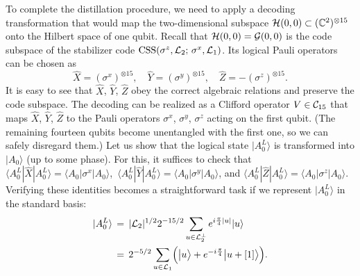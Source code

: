 \documentclass[pra,twocolumn,showpacs]{revtex4}
\newcommand{\CC}{\mathbb{C}}
\newcommand{\calL}{{\cal L }}
\newcommand{\calH}{{\cal H }}
\newcommand{\calG}{{\cal G }}
\newcommand{\la}{\langle}
\newcommand{\ra}{\rangle}
\newcommand*{\Cl}[1]{{\cal C}_{#1}}
\newcommand{\sx}{\sigma^x}
\newcommand{\sy}{\sigma^y}
\newcommand{\sz}{\sigma^z}
\DeclareMathOperator*{\CSS}{\mathop{\mathrm{CSS}}}
\begin{document}
To complete the distillation procedure, we need to apply a decoding
transformation that would map the two-dimensional subspace
$\calH(0,0)\subset(\CC^{2})^{\otimes 15}$ onto the Hilbert space of one
qubit. Recall that $\calH(0,0)=\calG(0,0)$ is the code subspace of the
stabilizer code $\CSS(\sz,\calL_2;\,\sx,\calL_1)$.  Its logical Pauli
operators can be chosen as
\[
\hat{X}={(\sx)}^{\otimes 15}, \quad \hat{Y}={(\sy)}^{\otimes 15}, \quad
\hat{Z}=-{(\sz)}^{\otimes 15}.
\]
It is easy to see that $\hat{X}$, $\hat{Y}$, $\hat{Z}$ obey the correct
algebraic relations and preserve the code subspace. The decoding can be
realized as a Clifford operator $V\in\Cl{15}$ that maps $\hat{X}$, $\hat{Y}$,
$\hat{Z}$ to the Pauli operators $\sx$, $\sy$, $\sz$ acting on the first
qubit. (The remaining fourteen qubits become unentangled with the first one,
so we can safely disregard them.) Let us show that the logical state
$|A_{0}^L\ra$ is transformed into $|A_{0}\ra$ (up to some phase). For this, it
suffices to check that $\la A_{0}^L|\hat{X}|A_{0}^L\ra=\la
A_{0}|\sigma^{x}|A_{0}\ra$,\, $\la A_{0}^L|\hat{Y}|A_{0}^L\ra=\la
A_{0}|\sigma^{y}|A_{0}\ra$, and $\la A_{0}^L|\hat{Z}|A_{0}^L\ra=\la
A_{0}|\sigma^{z}|A_{0}\ra$. Verifying these identities becomes a
straightforward task if we represent $|A_{0}^L\ra$ in the standard basis:
\begin{align*}
|A_{0}^L\ra\, &=\,|\calL_{2}|^{1/2} 2^{-15/2}\sum_{u\in\calL_{2}^{\perp}}
e^{i\frac{\pi}{4}|u|} |u\rangle\\
&=\, 2^{-5/2}\sum_{u\in\calL_1}
\Bigl(\bigl|u\bigr\rangle+e^{-i\frac{\pi}{4}}\bigl|u+[1]\bigr\rangle\Bigr).
\end{align*}
\end{document}
